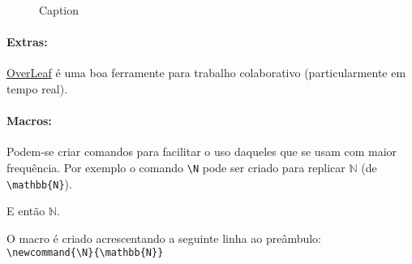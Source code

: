 \documentclass[10pt]{article}
\newcommand{\N}{\mathbb{N}}
\begin{document}
\begin{figure}[H]
    \centering
    \caption{Caption}
    \label{fig:tikz_example}
\end{figure}


\paragraph*{Extras:}
\href{https://www.overleaf.com/}{OverLeaf} é uma boa ferramente para trabalho colaborativo (particularmente em tempo real).


\paragraph*{Macros:}
Podem-se criar comandos para facilitar o uso daqueles que se usam com maior frequência. Por exemplo o comando \verb|\N| pode ser criado para replicar $\mathbb{N}$ (de \verb|\mathbb{N}|).

E então $\N$.

O macro é criado acrescentando a seguinte linha ao preâmbulo:\\
\verb|\newcommand{\N}{\mathbb{N}}|

\end{document}
